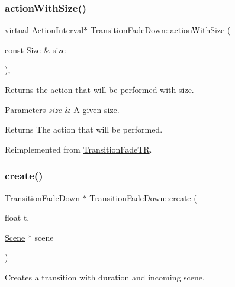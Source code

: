 \subsubsection{\texorpdfstring{action\+With\+Size()}{actionWithSize()}\hspace{0.1cm}{\footnotesize\ttfamily [2/2]}}
{\footnotesize\ttfamily virtual \hyperlink{classActionInterval}{Action\+Interval}$\ast$ Transition\+Fade\+Down\+::action\+With\+Size (\begin{DoxyParamCaption}\item[{const \hyperlink{classSize}{Size} \&}]{size }\end{DoxyParamCaption})\hspace{0.3cm}{\ttfamily [override]}, {\ttfamily [virtual]}}

Returns the action that will be performed with size.


\begin{DoxyParams}{Parameters}
{\em size} & A given size. \\
\hline
\end{DoxyParams}
\begin{DoxyReturn}{Returns}
The action that will be performed. 
\end{DoxyReturn}


Reimplemented from \hyperlink{classTransitionFadeTR_a371a39553335050a845c6743d20aac00}{Transition\+Fade\+TR}.

\mbox{\label{classTransitionFadeDown_a4893a2797134bd7d35b0ead3913dadea}} 
\subsubsection{\texorpdfstring{create()}{create()}\hspace{0.1cm}{\footnotesize\ttfamily [1/2]}}
{\footnotesize\ttfamily \hyperlink{classTransitionFadeDown}{Transition\+Fade\+Down} $\ast$ Transition\+Fade\+Down\+::create (\begin{DoxyParamCaption}\item[{float}]{t,  }\item[{\hyperlink{classScene}{Scene} $\ast$}]{scene }\end{DoxyParamCaption})\hspace{0.3cm}{\ttfamily [static]}}

Creates a transition with duration and incoming scene.


